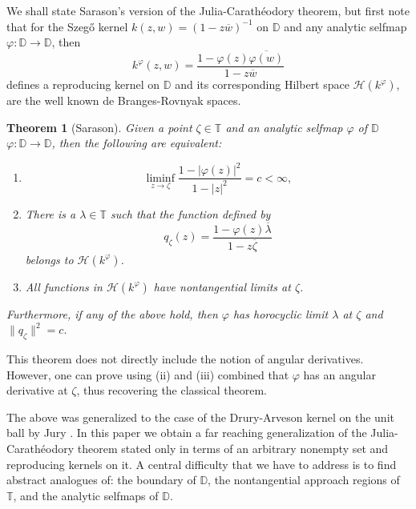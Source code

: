 \documentclass[leqno, final]{article}
\newtheorem*{theorem*}{Theorem} %
\theoremstyle{definition}
\newcommand{\disk}{\mathbb{D}}
\newcommand{\torus}{\mathbb{T}}
\newcommand{\Hilbert}{\mathcal{H}}
\renewcommand{\phi}{\varphi}
\renewcommand{\bar}{\overline}
\begin{document}
We shall state Sarason's version of the Julia-Carath\'eodory theorem,
but first note that for the Szeg\H{o} kernel $k(z,w)=(1 - z\bar w)^{-1}$ on
$\disk$ and any analytic selfmap
$\phi:\disk\to\disk$, then \[
	k^\phi(z,w) = \frac{1 - \phi(z)\bar{\phi(w)}}{1 - z\bar w}
\]
defines a reproducing kernel on $\disk$ and its corresponding Hilbert space $\Hilbert(k^\phi)$,
are the well known de Branges-Rovnyak spaces.
\begin{theorem*}[Sarason]
Given a point $\zeta\in\torus$ and an analytic selfmap $\phi$ of $\disk$
$\phi:\disk\to\disk$, then the following are equivalent:
\begin{enumerate}[label=(\roman*)]
\item \[
	\liminf_{z\to\zeta}\frac{1-|\phi(z)|^2}{1-|z|^2} = c < \infty,
\]
\item There is a $\lambda\in\torus$ such that the function defined by\[
	q_\zeta(z) = \frac{1-\phi(z)\overline\lambda}{1-z\overline\zeta}
\]
belongs to $\Hilbert(k^\phi)$.
\item All functions in $\Hilbert(k^\phi)$ have nontangential limits at $\zeta$.
\end{enumerate}
Furthermore, if any of the above hold, then $\phi$ has horocyclic limit $\lambda$ at $\zeta$ and
$\|q_\zeta\|^2=c$.
\end{theorem*}
\noindent This theorem does not directly include the notion of angular derivatives. However,
one can prove using (ii) and (iii) combined that $\phi$ has an angular derivative at
$\zeta$, thus recovering the classical theorem.

The above was generalized to the case of the Drury-Arveson kernel on the
unit ball by Jury \cite{jury_julia-caratheodory}. In this paper we obtain a
far reaching generalization of the Julia-Carathéodory theorem stated only in
terms of an arbitrary  nonempty set and reproducing kernels on it. A central
difficulty that we have to address is to find abstract analogues of:  the
boundary of $\disk$, the nontangential approach regions of $\torus$, and the
analytic selfmaps of $\disk$.
\end{document}
